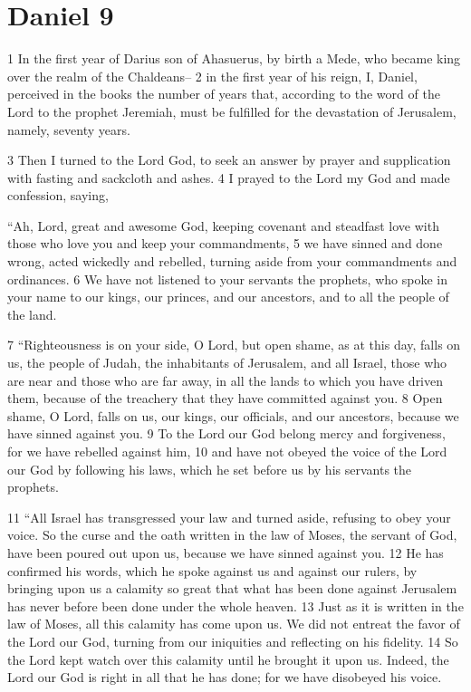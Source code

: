 \chapter{Daniel 9}
\label{ch:daniel9}

1 In the first year of Darius son of Ahasuerus, by birth a Mede, who became king 
over the realm of the Chaldeans-- 2 in the first year of his reign, I, Daniel,
perceived in the books the number of years that, according to the word of the 
Lord to the prophet Jeremiah, must be fulfilled for the devastation of Jerusalem,
namely, seventy years.

3 Then I turned to the Lord God, to seek an answer by prayer and supplication 
with fasting and sackcloth and ashes. 4 I prayed to the Lord my God and made 
confession, saying,

``Ah, Lord, great and awesome God, keeping covenant and steadfast love with 
those who love you and keep your commandments, 5 we have sinned and done 
wrong, acted wickedly and rebelled, turning aside from your commandments 
and ordinances. 6 We have not listened to your servants the prophets, who spoke 
in your name to our kings, our princes, and our ancestors, and to all the people 
of the land.

7 ``Righteousness is on your side, O Lord, but open shame, as at this day, falls 
on us, the people of Judah, the inhabitants of Jerusalem, and all Israel, those 
who are near and those who are far away, in all the lands to which you have 
driven them, because of the treachery that they have committed against you. 
8 Open shame, O Lord, falls on us, our kings, our officials, and our ancestors, 
because we have sinned against you. 9 To the Lord our God belong mercy and 
forgiveness, for we have rebelled against him, 10 and have not obeyed the voice 
of the Lord our God by following his laws, which he set before us by his 
servants the prophets.

11 ``All Israel has transgressed your law and turned aside, refusing to obey 
your voice. So the curse and the oath written in the law of Moses, the servant 
of God, have been poured out upon us, because we have sinned against you. 12 He 
has confirmed his words, which he spoke against us and against our rulers, by 
bringing upon us a calamity so great that what has been done against Jerusalem 
has never before been done under the whole heaven. 13 Just as it is written in 
the law of Moses, all this calamity has come upon us. We did not entreat the 
favor of the Lord our God, turning from our iniquities and reflecting on his 
fidelity. 14 So the Lord kept watch over this calamity until he brought it upon 
us. Indeed, the Lord our God is right in all that he has done; for we have 
disobeyed his voice.

